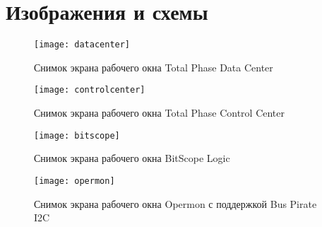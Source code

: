 \section{Изображения и схемы}
\label{app:figures}

\begin{figure}[H]
 \centering
 \texttt{[image: datacenter]}
 \caption{Снимок экрана рабочего окна Total Phase Data Center}
 \label{fig:datacenter}
\end{figure}

\begin{figure}[H]
 \centering
 \texttt{[image: controlcenter]}
 \caption{Снимок экрана рабочего окна Total Phase Control Center}
 \label{fig:controlcenter}
\end{figure}

\begin{figure}[H]
 \centering
 \texttt{[image: bitscope]}
 \caption{Снимок экрана рабочего окна BitScope Logic}
 \label{fig:bitscopelogic}
\end{figure}

\begin{figure}[H]
 \centering
 \texttt{[image: opermon]}
 \caption{Снимок экрана рабочего окна Opermon с поддержкой Bus Pirate I2C}
 \label{fig:opermon}
\end{figure}
